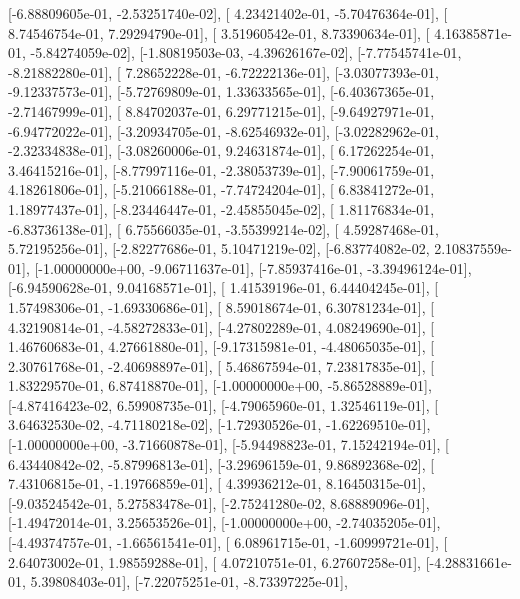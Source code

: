 \documentclass{article}
\begin{document}
       [-6.88809605e-01, -2.53251740e-02],
       [ 4.23421402e-01, -5.70476364e-01],
       [ 8.74546754e-01,  7.29294790e-01],
       [ 3.51960542e-01,  8.73390634e-01],
       [ 4.16385871e-01, -5.84274059e-02],
       [-1.80819503e-03, -4.39626167e-02],
       [-7.77545741e-01, -8.21882280e-01],
       [ 7.28652228e-01, -6.72222136e-01],
       [-3.03077393e-01, -9.12337573e-01],
       [-5.72769809e-01,  1.33633565e-01],
       [-6.40367365e-01, -2.71467999e-01],
       [ 8.84702037e-01,  6.29771215e-01],
       [-9.64927971e-01, -6.94772022e-01],
       [-3.20934705e-01, -8.62546932e-01],
       [-3.02282962e-01, -2.32334838e-01],
       [-3.08260006e-01,  9.24631874e-01],
       [ 6.17262254e-01,  3.46415216e-01],
       [-8.77997116e-01, -2.38053739e-01],
       [-7.90061759e-01,  4.18261806e-01],
       [-5.21066188e-01, -7.74724204e-01],
       [ 6.83841272e-01,  1.18977437e-01],
       [-8.23446447e-01, -2.45855045e-02],
       [ 1.81176834e-01, -6.83736138e-01],
       [ 6.75566035e-01, -3.55399214e-02],
       [ 4.59287468e-01,  5.72195256e-01],
       [-2.82277686e-01,  5.10471219e-02],
       [-6.83774082e-02,  2.10837559e-01],
       [-1.00000000e+00, -9.06711637e-01],
       [-7.85937416e-01, -3.39496124e-01],
       [-6.94590628e-01,  9.04168571e-01],
       [ 1.41539196e-01,  6.44404245e-01],
       [ 1.57498306e-01, -1.69330686e-01],
       [ 8.59018674e-01,  6.30781234e-01],
       [ 4.32190814e-01, -4.58272833e-01],
       [-4.27802289e-01,  4.08249690e-01],
       [ 1.46760683e-01,  4.27661880e-01],
       [-9.17315981e-01, -4.48065035e-01],
       [ 2.30761768e-01, -2.40698897e-01],
       [ 5.46867594e-01,  7.23817835e-01],
       [ 1.83229570e-01,  6.87418870e-01],
       [-1.00000000e+00, -5.86528889e-01],
       [-4.87416423e-02,  6.59908735e-01],
       [-4.79065960e-01,  1.32546119e-01],
       [ 3.64632530e-02, -4.71180218e-02],
       [-1.72930526e-01, -1.62269510e-01],
       [-1.00000000e+00, -3.71660878e-01],
       [-5.94498823e-01,  7.15242194e-01],
       [ 6.43440842e-02, -5.87996813e-01],
       [-3.29696159e-01,  9.86892368e-02],
       [ 7.43106815e-01, -1.19766859e-01],
       [ 4.39936212e-01,  8.16450315e-01],
       [-9.03524542e-01,  5.27583478e-01],
       [-2.75241280e-02,  8.68889096e-01],
       [-1.49472014e-01,  3.25653526e-01],
       [-1.00000000e+00, -2.74035205e-01],
       [-4.49374757e-01, -1.66561541e-01],
       [ 6.08961715e-01, -1.60999721e-01],
       [ 2.64073002e-01,  1.98559288e-01],
       [ 4.07210751e-01,  6.27607258e-01],
       [-4.28831661e-01,  5.39808403e-01],
       [-7.22075251e-01, -8.73397225e-01],
\end{document}
